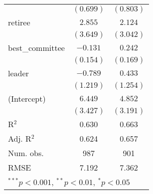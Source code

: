 \documentclass[12pt]{article}
\begin{document}
\begin{table}
\begin{center}
\begin{tabular}{l c c }
			& $(0.699)$      & $(0.803)$      \\
			retiree                  & $2.855$        & $2.124$        \\
			& $(3.649)$      & $(3.042)$      \\
			best\_committee          & $-0.131$       & $0.242$        \\
			& $(0.154)$      & $(0.169)$      \\
			leader                   & $-0.789$       & $0.433$        \\
			& $(1.219)$      & $(1.254)$      \\
			(Intercept)              & $6.449$        & $4.852$        \\
			& $(3.427)$      & $(3.191)$      \\
			\hline
			R$^2$                    & 0.630          & 0.663          \\
			Adj. R$^2$               & 0.624          & 0.657          \\
			Num. obs.                & 987            & 901            \\
			RMSE                     & 7.192          & 7.362          \\
			\hline
			\multicolumn{3}{l}{\scriptsize{$^{***}p<0.001$, $^{**}p<0.01$, $^*p<0.05$}}
		\end{tabular}
	\end{center}
\end{table}
\end{document}
